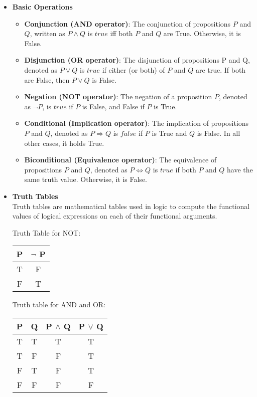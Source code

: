 \begin{itemize}

\item \textbf{Basic Operations}

\begin{itemize}

\item \textbf{Conjunction (AND operator)}: The conjunction of propositions $P$ and $Q$, written as $P \land Q$ is $true$ iff both $P$ and $Q$ are True. Otherwise, it is False.

\item \textbf{Disjunction (OR operator)}: The disjunction of propositions P and Q, denoted as $P \lor Q$ is $true$ if either (or both) of $P$ and $Q$ are true. If both are False, then $P \lor Q$ is False.

\item \textbf{Negation (NOT operator)}: The negation of a proposition $P$, denoted as $\neg P$, is $true$ if $P$ is False, and False if $P$ is True.

\item \textbf{Conditional (Implication operator)}: The implication of propositions $P$ and $Q$, denoted as $P \Rightarrow Q$ is $false$ if $P$ is True and $Q$ is False. In all other cases, it holds True. 

\item \textbf{Biconditional (Equivalence operator)}: The equivalence of propositions $P$ and $Q$, denoted as $P \Leftrightarrow Q$ is $true$ if both $P$ and $Q$ have the same truth value. Otherwise, it is False.

\end{itemize}

\item \textbf{Truth Tables} \\ Truth tables are mathematical tables used in logic to compute the functional values of logical expressions on each of their functional arguments.

Truth Table for NOT:

\begin{tabular}{|c|c|}
\hline
P & $\neg$ P \\
\hline
T & F \\
\hline
F & T \\
\hline
\end{tabular}

Truth table for AND and OR:

\begin{tabular}{|c|c|c|c|}
\hline
P & Q & P $\land$ Q & P $\lor$ Q \\
\hline
T & T & T & T \\
\hline
T & F & F & T \\
\hline
F & T & F & T \\
\hline
F & F & F & F \\
\hline
\end{tabular}


\end{itemize}
